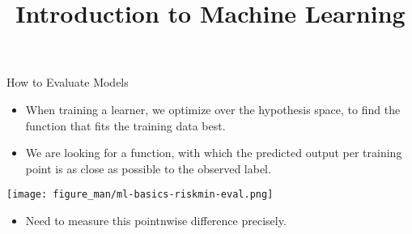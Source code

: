 \documentclass[11pt,compress,t,notes=noshow, xcolor=table]{beamer}
\title{Introduction to Machine Learning}
\begin{document}


\begin{vbframe}{How to Evaluate Models}

\begin{itemize}
\item When training a learner, we optimize over the hypothesis space,
    to find the function that fits the training data best.
\item We are looking for a function, with which the 
    predicted output per training point is as close as possible to
    the observed label.
\end{itemize}

\lz




\begin{center}\texttt{[image: figure\_man/ml-basics-riskmin-eval.png]} \end{center}

\lz


\begin{itemize}
    \item Need to measure this pointnwise difference precisely.
  \end{itemize}
  
\end{vbframe}
\end{document}
